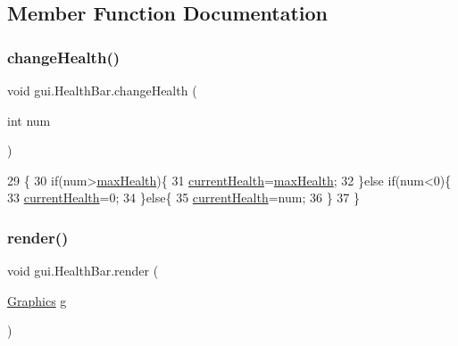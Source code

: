 \subsection{Member Function Documentation}
\mbox{\label{classgui_1_1_health_bar_a4e51c8bf35eb0db3d98f2bad5d236890}} 
\subsubsection{\texorpdfstring{change\+Health()}{changeHealth()}}
{\footnotesize\ttfamily void gui.\+Health\+Bar.\+change\+Health (\begin{DoxyParamCaption}\item[{int}]{num }\end{DoxyParamCaption})\hspace{0.3cm}{\ttfamily [inline]}}


\begin{DoxyCode}
29                                      \{
30         \textcolor{keywordflow}{if}(num>\mbox{\hyperlink{classgui_1_1_health_bar_a140d4fec43b960a1ba75f3e767501e6f}{maxHealth}})\{
31             \mbox{\hyperlink{classgui_1_1_health_bar_a598c9b29bf24fe830bff5d1ea2707b02}{currentHealth}}=\mbox{\hyperlink{classgui_1_1_health_bar_a140d4fec43b960a1ba75f3e767501e6f}{maxHealth}};
32         \}\textcolor{keywordflow}{else} \textcolor{keywordflow}{if}(num<0)\{
33             \mbox{\hyperlink{classgui_1_1_health_bar_a598c9b29bf24fe830bff5d1ea2707b02}{currentHealth}}=0;
34         \}\textcolor{keywordflow}{else}\{
35             \mbox{\hyperlink{classgui_1_1_health_bar_a598c9b29bf24fe830bff5d1ea2707b02}{currentHealth}}=num;
36         \}
37     \}
\end{DoxyCode}
\mbox{\label{classgui_1_1_health_bar_a9c40e5b00050d6264dae96d7054fab06}} 
\subsubsection{\texorpdfstring{render()}{render()}}
{\footnotesize\ttfamily void gui.\+Health\+Bar.\+render (\begin{DoxyParamCaption}\item[{\mbox{\hyperlink{classorg_1_1newdawn_1_1slick_1_1_graphics}{Graphics}}}]{g }\end{DoxyParamCaption})\hspace{0.3cm}{\ttfamily [inline]}}


